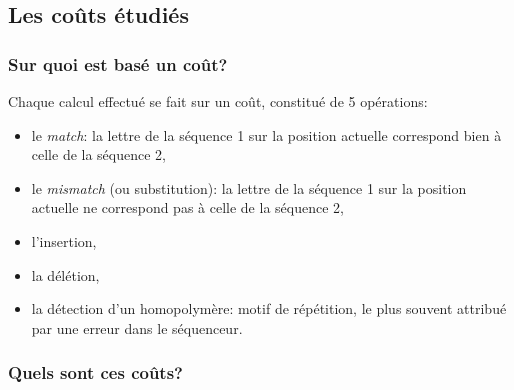 \documentclass[pdftex,12pt,a4paper]{report}
\begin{document}
\begin{spacing}{1.2}
\subsection{Les coûts étudiés}

\subsubsection{Sur quoi est basé un coût?}

Chaque calcul effectué se fait sur un coût, constitué de 5 opérations:
\begin{itemize}
\item{le \textit{match}: la lettre de la séquence 1 sur la position actuelle correspond bien à celle de la séquence 2,}
\item{le \textit{mismatch} (ou substitution): la lettre de la séquence 1 sur la position actuelle ne correspond pas à celle de la séquence 2,}
\item{l'insertion,}
\item{la délétion,}
\item{la détection d'un homopolymère: motif de répétition, le plus souvent attribué par une erreur dans le séquenceur.}
\end{itemize}

\subsubsection{Quels sont ces coûts?}


\end{spacing}
\end{document}
